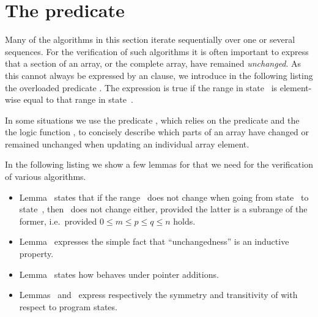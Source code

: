 
\section{The predicate \Unchanged}

Many of the algorithms in this section iterate sequentially over one or several sequences.
For the verification of such algorithms it is often important to express that a section
of an array, or the complete array, have remained \emph{unchanged}.
As this cannot always be expressed by an  clause,
we introduce in the following listing the overloaded predicate
.
The expression  is true if the range
 in state~ is element-wise equal to that range in state~.



In some situations we use the predicate \ArrayUpdate,
which relies on the predicate \Unchanged and the the logic function ,
to concisely describe which parts of an array have changed or remained unchanged
when updating an individual array element.




\clearpage

In the following listing we show a few lemmas for 
that we need for the verification of various algorithms.



\begin{itemize}
\item
Lemma~ states that if the range~ does
not change when going from state~ to state~, then~
does not change either, provided the latter is a subrange of the
former, i.e.\ provided $0 \leq m \leq p \leq q \leq n$ holds.

\item
Lemma~ expresses the simple fact that ``unchangedness'' is an inductive property.

\item
Lemma~ states how \Unchanged behaves under pointer additions.

\item
Lemmas~ and~ express respectively
the symmetry and transitivity of \Unchanged with respect to program states.

\end{itemize}


\clearpage

